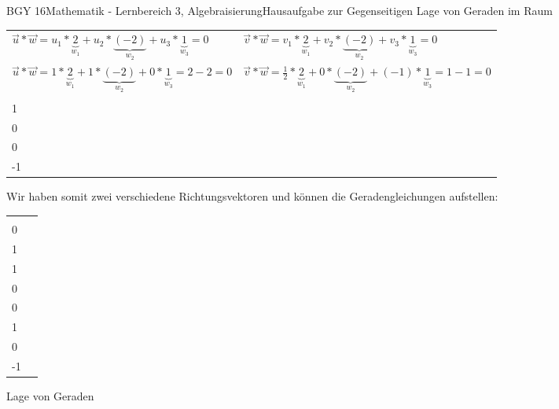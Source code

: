 \documentclass[oneside,openany,headings=optiontotoc,11pt,numbers=noenddot]{scrreprt}
\begin{document}
\begin{worksheet}{BGY 16}{Mathematik - Lernbereich 3, Algebraisierung}{Hausaufgabe zur Gegenseitigen Lage von Geraden im Raum}
\begin{framed}
\begin{tabularx}{\textwidth}{X|X}
				\par\noindent
				\(\vec{u}*\vec{w} = u_1*\underbrace{2}_{w_1}+u_2*\underbrace{(-2)}_{w_2}+u_3*\underbrace{1}_{w_3} = 0\) & 				\(\vec{v}*\vec{w} = v_1*\underbrace{2}_{w_1}+v_2*\underbrace{(-2)}_{w_2}+v_3*\underbrace{1}_{w_3} = 0\)\\
				\(\vec{u}*\vec{w} = 1*\underbrace{2}_{w_1}+1*\underbrace{(-2)}_{w_2}+0*\underbrace{1}_{w_3} = 2 - 2 = 0\) & 				\(\vec{v}*\vec{w} = \frac{1}{2}*\underbrace{2}_{w_1}+0*\underbrace{(-2)}_{w_2}+(-1)*\underbrace{1}_{w_3} = 1 - 1 = 0\)\\
				\par\noindent
				\(\vec{u} = \left(\begin{array}{c}1\\1\\0\end{array}\right)\) & \(\vec{v} = \left(\begin{array}{c}\frac{1}{2}\\0\\-1\end{array}\right)\)
			\end{tabularx}
			\newpage
			\noindent
			Wir haben somit zwei verschiedene Richtungsvektoren und können die Geradengleichungen aufstellen:\\
			\begin{tabularx}{\textwidth}{XX}
				\(h_1: \vec{x} = \left(\begin{array}{c}2\\0\\1\end{array}\right) + s*\left(\begin{array}{c}1\\1\\0\end{array}\right)\) & \(h_2: \vec{x} = \left(\begin{array}{c}2\\0\\1\end{array}\right) + t*\left(\begin{array}{c}\frac{1}{2}\\0\\-1\end{array}\right)\)
			\end{tabularx}
		\end{framed}
		\begin{framed}
			\noindent
			\tiny{\color{codegray}Lage von Geraden}\\
			\normalcolor\normalsize\noindent

\end{framed}
\end{worksheet}
\end{document}
